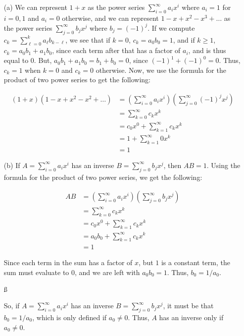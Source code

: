 \documentclass{hmwk}
\begin{document}
\begin{solution}
\begin{itemize}
    \item[(a)] We can represent $1 + x$ as the power series $\sum_{i = 0}^\infty a_ix^i$ where $a_i = 1$ for $i = 0, 1$ and $a_i = 0$ otherwise, and we can represent $1 - x + x^2 - x^3 + \dots$ as the power series $\sum_{j = 0}^\infty b_jx^j$ where $b_j = (-1)^j$. If we compute $c_k = \sum_{\ell = 0}^k a_\ell b_{k - \ell}$, we see that if $k = 0$, $c_k = a_0b_0 = 1$, and if $k \geq 1$, $c_k = a_0b_1 + a_1b_0$, since each term after that has a factor of $a_i$, and is thus equal to 0. But, $a_0b_1 + a_1b_0 = b_1 + b_0 = 0$, since $(-1)^1 + (-1)^0 = 0$. Thus, $c_k = 1$ when $k=0$ and $c_k = 0$ otherwise. Now, we use the formula for the product of two power series to get the following:

    \begin{align*}
        (1 + x)(1 - x + x^2 - x^2 + \dots) &= \left(\sum_{i = 0}^\infty a_ix^i\right)\left(\sum_{j = 0}^\infty (-1)^jx^j\right) \\
        &= \sum_{k=0}^\infty c_k x^k \\
        &= c_0x^0 + \sum_{k=1}^\infty c_k x^k \\
        &= 1 + \sum_{k=1}^\infty 0 x^k \\
        &= 1
    \end{align*}

    \item[(b)] If $A = \sum_{i = 0}^\infty a_ix^i$ has an inverse $B = \sum_{j=0}^\infty b_jx^j$, then $AB = 1$. Using the formula for the product of two power series, we get the following:

    \begin{align*}
        AB &= \left(\sum_{i = 0}^\infty a_ix^i\right)\left(\sum_{j=0}^\infty b_jx^j\right) \\
        &= \sum_{k=0}^\infty c_k x^k \\
        &= c_0x^0 + \sum_{k=1}^\infty c_k x^k \\
        &= a_0b_0 + \sum_{k=1}^\infty c_k x^k \\
        &= 1
    \end{align*}

    Since each term in the sum has a factor of $x$, but $1$ is a constant term, the sum must evaluate to 0, and we are left with $a_0b_0 = 1$. Thus, $b_0 = 1/a_0$. 

    \ss

    So, if $A = \sum_{i = 0}^\infty a_ix^i$ has an inverse $B = \sum_{j=0}^\infty b_jx^j$, it must be that $b_0 = 1/a_0$, which is only defined if $a_0 \neq 0$. Thus, $A$ has an inverse only if $a_0 \neq 0$.


\end{itemize}
\end{solution}
\end{document}
